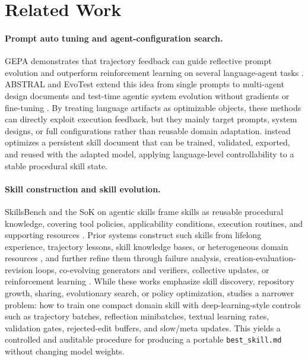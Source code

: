 \section{Related Work}
\label{sec:related_work}

\paragraph{Prompt auto tuning and agent-configuration search.}
GEPA demonstrates that trajectory feedback can guide reflective prompt evolution and outperform reinforcement learning on several language-agent tasks \citep{agrawal2025gepa}. ABSTRAL and EvoTest extend this idea from single prompts to multi-agent design documents and test-time agentic system evolution without gradients or fine-tuning \citep{song2026abstral,he2025evotest}. By treating language artifacts as optimizable objects, these methods can directly exploit execution feedback, but they mainly target prompts, system designs, or full configurations rather than reusable domain adaptation. \ourmethod{} instead optimizes a persistent skill document that can be trained, validated, exported, and reused with the adapted model, applying language-level controllability to a stable procedural skill state.

\paragraph{Skill construction and skill evolution.}
SkillsBench and the SoK on agentic skills frame skills as reusable procedural knowledge, covering tool policies, applicability conditions, execution routines, and supporting resources \citep{li2026skillsbench,jiang2026sok}. Prior systems construct such skills from lifelong experience, trajectory lessons, skill knowledge bases, or heterogeneous domain resources \citep{yang2026autoskill,ni2026trace2skill,wang2026skillx,shen2026skillfoundry,memp}, and further refine them through failure analysis, creation-evaluation-revision loops, co-evolving generators and verifiers, collective updates, or reinforcement learning \citep{alzubi2026evoskill,luo2026skillforge,zhang2026coevoskills,ma2026skillclaw,xia2026skillrl,wang2025reinforcement,autorefine,procmem,evolver}. While these works emphasize skill discovery, repository growth, sharing, evolutionary search, or policy optimization, \ourmethod{} studies a narrower problem: how to train one compact domain skill with deep-learning-style controls such as trajectory batches, reflection minibatches, textual learning rates, validation gates, rejected-edit buffers, and slow/meta updates. This yields a controlled and auditable procedure for producing a portable \texttt{best\_skill.md} without changing model weights.
